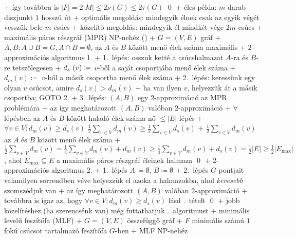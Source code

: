       + így továbbra is $\lvert F \rvert = 2 \lvert M \rvert \le 2
        \nu(G) \le 2 \tau(G)$ \qed
  + éles példa: $m$ darab diszjunkt $1$ hosszú út
    + optimális megoldás: mindegyik élnek csak az egyik végét vesszük
      bele \RA $m$ csúcs
    + közelítő megoldás: mindegyik él mindkét vége \RA $2m$ csúcs
+ \prob maximális páros részgráf (MPR) \RA NP-nehéz (\noproof)
    + \DataIn $G = (V, E)$ gráf
    + $A, B: A \cup B = G, A \cap B = \emptyset$, az $A$ és $B$ között
      menő élek száma maximális
    + \alg \label{alg:kozelito:multi:paros1}$2$-approximációs algoritmus 1.
      + 1.~lépés: osszuk ketté a csúcshalmazat $A$-ra és $B$-re
        tetszőlegesen
      + $d_{\mathrlap{s}\phantom{m}}(v) \coloneqq$ $v$-ből a saját
        csoportjába menő élek száma
      + $d_m(v) \coloneqq$ $v$-ből a másik csoportba menő élek száma
      + 2.~lépés: keressünk egy olyan $v$ csúcsot, amire $d_s(v) >
        d_m(v)$
        + ha van ilyen $v$, helyezzük át a másik csoportba; GOTO 2.
      + 3.~lépés: $(A, B)$ egy $2$-approximáció az MPR problémára
      + \thm \label{thm:kozelito:multi:paros1}az így meghatározott $(A, B)$ valóban $2$-approximáció
        + \proof $\forall$ lépésben az $A$ és $B$ között haladó élek
          száma nő \RA $\le \lvert E \rvert$ lépés
        + $\forall v \in V : d_m(v) \ge d_s(v)$ \RA $\frac{1}{2}
          \sum_{v \in V} d_m(v) \ge \frac{1}{2} \sum_{v \in V} d_s(v)$
        + $\frac{1}{2} \sum_{v \in V} d_m(v)$ az $A$ és $B$ között
          menő élek száma
        + $\frac{1}{2} \sum_{v \in V} d_m(v) = \frac{1}{4} \sum_{v
          \in V} d_m(v) + d_m(v) \ge \frac{1}{4} \sum_{v \in V}
          d_m(v) + d_s(v) = \frac{1}{2} \lvert E \rvert \ge
          \frac{1}{2} \lvert E_{\max} \rvert$,
          ahol $E_{\max} \subseteq E$ a maximális páros részgráf
          éleinek halmaza \qed
    + \alg $2$-approximációs algoritmus 2.
      + 1.~lépés $A \coloneqq \emptyset$, $B \coloneqq \emptyset$
      + 2.~lépés $G$ pontjait valamilyen sorrendben véve helyezzük el
        azoka a halmazokba, ahol \emph{kevesebb} szomszédjuk van
      + \thm az így meghatározott $(A, B)$ valóban $2$-approximáció
        + továbbra is igaz az, hogy $\forall v \in V : d_m(v) \ge
        d_s(v)$ \RA lásd .~tételt \qed
      + jobb közelítéshez (ha szerencsénk van) még futtathatjuk
        .~algoritmust
+ \prob minimális levelű feszítőfa (MLF)
  + \DataIn $G = (V, E)$ összefüggő gráf
  + \DataOut $F$ minimális számú $1$ fokú csúcsot tartalmazó feszítőfa
    $G$-ben
  + \thm MLF NP-nehéz
